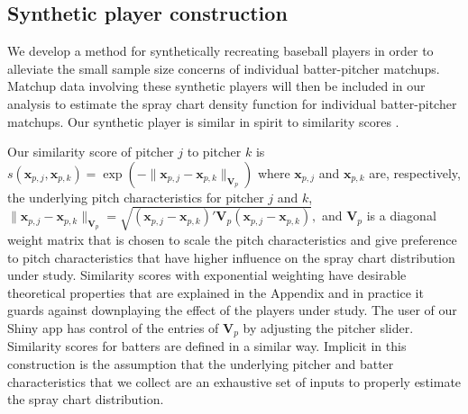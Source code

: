 \documentclass[11pt]{article}
\newcommand{\V}{\textbf{V}}
\newcommand{\x}{\textbf{x}}
\begin{document}
\subsection{Synthetic player construction}

We develop a method for synthetically recreating baseball players in order to alleviate the small sample size concerns of individual batter-pitcher matchups. Matchup data involving these synthetic players will then be included in our analysis to estimate the spray chart density function for individual batter-pitcher matchups. Our synthetic player is %
similar in spirit to similarity scores \citep{james1994politics, PECOTA}.  

Our similarity score of pitcher $j$ to pitcher $k$ is $s(\x_{p,j}, \x_{p,k}) = \exp(-\|\x_{p,j}-\x_{p,k}\|_{\V_p})$ where $\x_{p,j}$ and $\x_{p,k}$ are, respectively, the underlying pitch characteristics for pitcher $j$ and $k$,
$
 \|\x_{p,j}-\x_{p,k}\|_{\V_p} = \sqrt{(\x_{p,j}-\x_{p,k})'\V_p(\x_{p,j}-\x_{p,k})},
$ 
and $\V_p$ is a diagonal weight matrix that is chosen to scale the pitch characteristics and give preference to pitch characteristics that have higher influence on the spray chart distribution under study. Similarity scores with exponential weighting have desirable theoretical properties that are explained in the Appendix and in practice it guards against downplaying the effect of the players under study. The user of our Shiny app has control of the entries of $\V_p$ by adjusting the pitcher slider. Similarity scores for batters are defined in a similar way. Implicit in this construction is the assumption that the underlying pitcher and batter characteristics that we collect are an exhaustive set of inputs to properly estimate the spray chart distribution.
\end{document}

